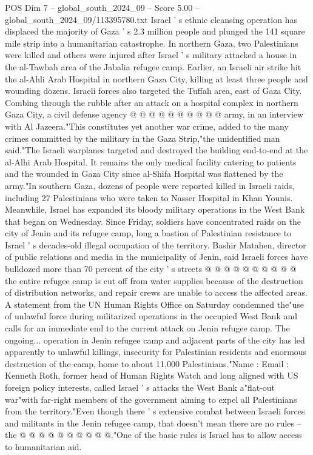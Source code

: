 \begin{textsample}{POS Dim 7 – global\_south\_2024\_09 – Score 5.00 – global\_south\_2024\_09/113395780.txt}
Israel ' s ethnic cleansing operation has displaced the majority of Gaza ' s 2.3 million people and plunged the 141 square mile strip into a humanitarian catastrophe.
In northern Gaza, two Palestinians were killed and others were injured after Israel ' s military attacked a house in the al-Tawbah area of the Jabalia refugee camp.
Earlier, an Israeli air strike hit the al-Ahli Arab Hospital in northern Gaza City, killing at least three people and wounding dozens.
Israeli forces also targeted the Tuffah area, east of Gaza City.
Combing through the rubble after an attack on a hospital complex in northern Gaza City, a civil defense agency @ @ @ @ @ @ @ @ @ @ army, in an interview with Al Jazeera."This constitutes yet another war crime, added to the many crimes committed by the military in the Gaza Strip,"the unidentified man said."The Israeli warplanes targeted and destroyed the building end-to-end at the al-Alhi Arab Hospital.
It remains the only medical facility catering to patients and the wounded in Gaza City since al-Shifa Hospital was flattened by the army."In southern Gaza, dozens of people were reported killed in Israeli raids, including 27 Palestinians who were taken to Nasser Hospital in Khan Younis.
Meanwhile, Israel has expanded its bloody military operations in the West Bank that began on Wednesday.
Since Friday, soldiers have concentrated raids on the city of Jenin and its refugee camp, long a bastion of Palestinian resistance to Israel ' s decades-old illegal occupation of the territory.
Bashir Matahen, director of public relations and media in the municipality of Jenin, said Israeli forces have bulldozed more than 70 percent of the city ' s streets @ @ @ @ @ @ @ @ @ @ the entire refugee camp is cut off from water supplies because of the destruction of distribution networks, and repair crews are unable to access the affected areas.
A statement from the UN Human Rights Office on Saturday condemned the"use of unlawful force during militarized operations in the occupied West Bank and calls for an immediate end to the current attack on Jenin refugee camp.
The ongoing... operation in Jenin refugee camp and adjacent parts of the city has led apparently to unlawful killings, insecurity for Palestinian residents and enormous destruction of the camp, home to about 11,000 Palestinians."Name : Email : Kenneth Roth, former head of Human Rights Watch and long aligned with US foreign policy interests, called Israel ' s attacks the West Bank a"flat-out war"with far-right members of the government aiming to expel all Palestinians from the territory."Even though there ' s extensive combat between Israeli forces and militants in the Jenin refugee camp, that doesn't mean there are no rules -- the @ @ @ @ @ @ @ @ @ @."One of the basic rules is Israel has to allow access to humanitarian aid.

\end{textsample}
